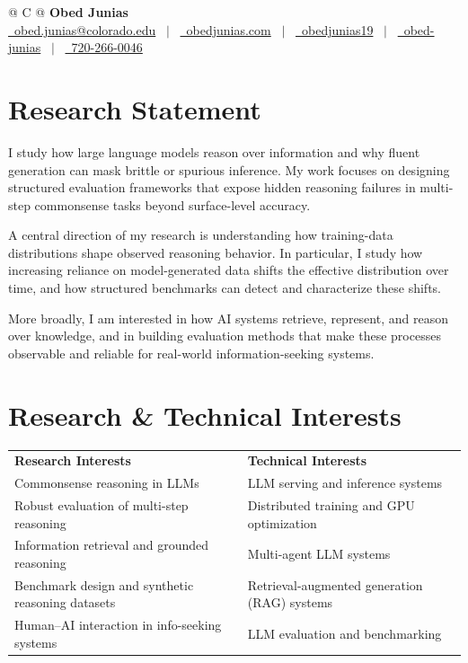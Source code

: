 \documentclass[a4paper,11pt]{article}
\begin{document}
\pagestyle{empty} 

\begin{tabularx}{\linewidth}{@{} C @{}}
  \Huge {\textbf{Obed Junias} }\\[1pt]
  \href{mailto:obed.junias@colorado.edu}{\raisebox{-0.05\height}\faEnvelope \ obed.junias@colorado.edu} \ $|$ \
  \href{https://obedjunias.github.io}{\raisebox{-0.05\height}\faGlobe\ obedjunias.com} \ $|$ \
  \href{https://github.com/obedjunias19}{\raisebox{-0.05\height}\faGithub \ obedjunias19} \ $|$ \
  \href{https://linkedin.com/in/obed-junias}{\raisebox{-0.05\height}\faLinkedin\ obed-junias} \ $|$ \
  \href{tel:+1720-266-0046}{\raisebox{-0.05\height}\faMobile \ 720-266-0046} \\
\end{tabularx}

\color{BlueViolet}
\section*{Research Statement}
\color{black}
I study how large language models reason over information and why fluent generation can mask brittle or spurious inference. My work focuses on designing structured evaluation frameworks that expose hidden reasoning failures in multi-step commonsense tasks beyond surface-level accuracy.

A central direction of my research is understanding how training-data distributions shape observed reasoning behavior. In particular, I study how increasing reliance on model-generated data shifts the effective distribution over time, and how structured benchmarks can detect and characterize these shifts.

More broadly, I am interested in how AI systems retrieve, represent, and reason over knowledge, and in building evaluation methods that make these processes observable and reliable for real-world information-seeking systems.

\color{BlueViolet}
\section*{Research \& Technical Interests}
\color{black}

\begin{tabularx}{\linewidth}{@{}X X@{}}
\textbf{Research Interests} & \textbf{Technical Interests} \\
Commonsense reasoning in LLMs & LLM serving and inference systems \\
Robust evaluation of multi-step reasoning & Distributed training and GPU optimization \\
Information retrieval and grounded reasoning & Multi-agent LLM systems \\
Benchmark design and synthetic reasoning datasets & Retrieval-augmented generation (RAG) systems \\
Human–AI interaction in info-seeking systems & LLM evaluation and benchmarking \\
\end{tabularx}
\end{document}
